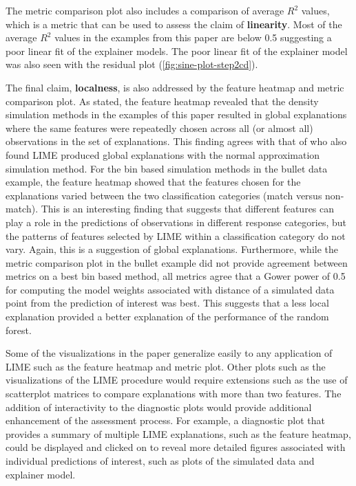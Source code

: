 \documentclass[AMS,STIX2COL]{WileyNJD-v2}\usepackage[]{graphicx}\usepackage[]{color}
\begin{document}
{The metric comparison plot also includes a comparison of average $R^2$ values, which is a metric that can be used to assess the claim of \textbf{linearity}. Most of the average $R^2$ values in the examples from this paper are below 0.5 suggesting a poor linear fit of the explainer models. The poor linear fit of the explainer model was also seen with the residual plot (\autoref{fig:sine-plot-step2cd}).

The final claim, \textbf{localness}, is also addressed by the feature heatmap and metric comparison plot. As stated, the feature heatmap revealed that the density simulation methods in the examples of this paper resulted in global explanations where the same features were repeatedly chosen across all (or almost all) observations in the set of explanations. This finding agrees with that of \citep{laugel:2019} who also found LIME produced global explanations with the normal approximation simulation method. For the bin based simulation methods in the bullet data example, the feature heatmap showed that the features chosen for the explanations varied between the two classification categories (match versus non-match). This is an interesting finding that suggests that different features can play a role in the predictions of observations in different response categories, but the patterns of features selected by LIME within a classification category do not vary. Again, this is a suggestion of global explanations. Furthermore, while the metric comparison plot in the bullet example did not provide agreement between metrics on a best bin based method, all metrics agree that a Gower power of 0.5 for computing the model weights associated with distance of a simulated data point from the prediction of interest was best. This suggests that a less local explanation provided a better explanation of the performance of the random forest.

Some of the visualizations in the paper generalize easily to any application of LIME such as the feature heatmap and metric plot. Other plots such as the visualizations of the LIME procedure would require extensions such as the use of scatterplot matrices to compare explanations with more than two features. The addition of interactivity to the diagnostic plots would provide additional enhancement of the assessment process. For example, a diagnostic plot that provides a summary of multiple LIME explanations, such as the feature heatmap, could be displayed and clicked on to reveal more detailed figures associated with individual predictions of interest, such as plots of the simulated data and explainer model.

}
\end{document}
